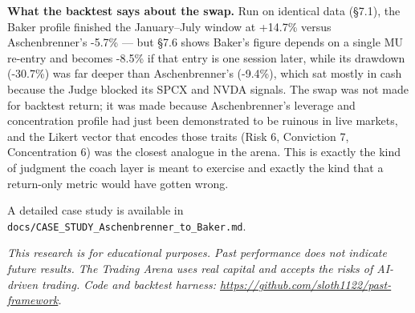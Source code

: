 \documentclass[11pt]{article}
\begin{document}
\textbf{What the backtest says about the swap.} Run on identical data (§7.1), the Baker profile finished the January--July window at +14.7\% versus Aschenbrenner's -5.7\% --- but §7.6 shows Baker's figure depends on a single MU re-entry and becomes -8.5\% if that entry is one session later, while its drawdown (-30.7\%) was far deeper than Aschenbrenner's (-9.4\%), which sat mostly in cash because the Judge blocked its SPCX and NVDA signals. The swap was not made for backtest return; it was made because Aschenbrenner's leverage and concentration profile had just been demonstrated to be ruinous in live markets, and the Likert vector that encodes those traits (Risk 6, Conviction 7, Concentration 6) was the closest analogue in the arena. This is exactly the kind of judgment the coach layer is meant to exercise and exactly the kind that a return-only metric would have gotten wrong.

A detailed case study is available in \texttt{docs/CASE\_STUDY\_Aschenbrenner\_to\_Baker.md}.

\vspace{1em}
\noindent\emph{This research is for educational purposes. Past performance does not indicate future results. The Trading Arena uses real capital and accepts the risks of AI-driven trading. Code and backtest harness: \url{https://github.com/sloth1122/past-framework}.}
\end{document}
